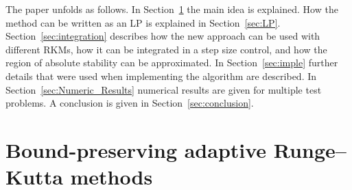 \documentclass[a4paper]{article}
\numberwithin{equation}{section}
\theoremstyle{plain}
\theoremstyle{definition}
\numberwithin{theorem}{section}
\newcommand{\1}{\mathbbm{1}}
\begin{document}
The paper unfolds as follows. In Section~\ref{sec:main_idea} the main idea is explained. How the method can be written as an LP is explained in Section~\ref{sec:LP}.
Section~\ref{sec:integration} describes how the new approach can be used with different RKMs, how it can be integrated in a step size control, and how the region of absolute stability can be approximated.
In Section~\ref{sec:imple} further details that were used when implementing the algorithm are described.
In Section~\ref{sec:Numeric_Results} numerical results are given for multiple test problems.
A conclusion is given in Section~\ref{sec:conclusion}.



\section{Bound-preserving adaptive Runge--Kutta methods}\label{sec:main_idea}
\end{document}
